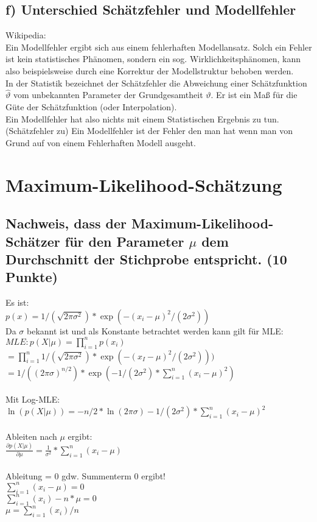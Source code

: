 \documentclass{scrartcl}
\begin{document}
\subsection*{f) Unterschied Schätzfehler und Modellfehler}
Wikipedia: \\
Ein Modellfehler ergibt sich aus einem fehlerhaften Modellansatz. Solch ein Fehler ist kein statistisches Phänomen, sondern ein sog. Wirklichkeitsphänomen, kann also beispielsweise durch eine Korrektur der Modellstruktur behoben werden. \\
In der Statistik bezeichnet der Schätzfehler die Abweichung einer Schätzfunktion $\hat{\vartheta}$ vom unbekannten Parameter der Grundgesamtheit $\vartheta$. Er ist ein Maß für die Güte der Schätzfunktion (oder Interpolation). \\

Ein Modellfehler hat also nichts mit einem Statistischen Ergebnis zu tun.(Schätzfehler zu) Ein Modellfehler ist der Fehler den man hat wenn man von Grund auf von einem Fehlerhaften Modell ausgeht. \\



\section{Maximum-Likelihood-Schätzung}
\subsection*{Nachweis, dass der Maximum-Likelihood-Schätzer für den Parameter $\mu$ dem Durchschnitt der Stichprobe entspricht. (10 Punkte)}
Es ist:\\
$p(x)=1/(\sqrt{2\pi \sigma^2})* \exp(-(x_i-\mu)^2/(2\sigma^2))$\\
Da $\sigma$ bekannt ist und als Konstante betrachtet werden kann gilt für MLE:\\
$MLE: p(X|\mu)=\prod_{i=1}^{n}p(x_i) $\\
$=\prod_{i=1}^{n}1/(\sqrt{2\pi \sigma^2})*\exp(-(x_I-\mu)^2/(2\sigma^2))) $\\
$= 1/((2\pi \sigma)^{n/2})* \exp(-1/(2\sigma^2)*\sum_{i=1}^{n}(x_i-\mu)^2)$\\\\
Mit Log-MLE:\\
$\ln(p(X|\mu))= -n/2*\ln(2\pi \sigma) - 1/(2\sigma^2)*\sum_{i=1}^{n}(x_i-\mu)^2$\\\\
Ableiten nach $\mu$ ergibt:\\
$\frac{\partial p(X|\mu)}{\partial \mu} = \frac{1}{\sigma^2}*\sum_{i=1}^{n}(x_i-\mu)$\\\\
Ableitung = 0 gdw. Summenterm 0 ergibt!\\
$\sum_{i=1}^{n}(x_i-\mu) = 0$\\
$\sum_{i=1}^{n}(x_i)-n*\mu = 0$\\
$\mu = \sum_{i=1}^{n}(x_i) / n$
\end{document}
